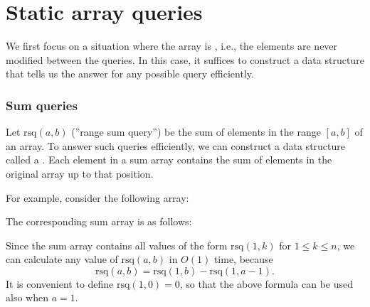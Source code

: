 \section{Static array queries}

We first focus on a situation where
the array is , i.e.,
the elements are never modified between the queries.
In this case, it suffices to construct
a data structure that tells us
the answer for any possible query efficiently.

\subsubsection{Sum queries}


Let $\textrm{rsq}(a,b)$ (''range sum query'') be the sum of
elements in the range $[a,b]$ of an array.
To answer such queries efficiently,
we can construct a data structure called
a .
Each element in a sum array contains
the sum of elements in the original array up to that position.

For example, consider the following array:
\begin{center}
\end{center}
The corresponding sum array is as follows:
\begin{center}
\end{center}
Since the sum array contains all values
of the form $\textrm{rsq}(1,k)$ for $1 \le k \le n$,
we can calculate any value of
$\textrm{rsq}(a,b)$ in $O(1)$ time, because
\[ \textrm{rsq}(a,b) = \textrm{rsq}(1,b) - \textrm{rsq}(1,a-1).\]
It is convenient to define $\textrm{rsq}(1,0)=0$,
so that the above formula can be used also when $a=1$.

